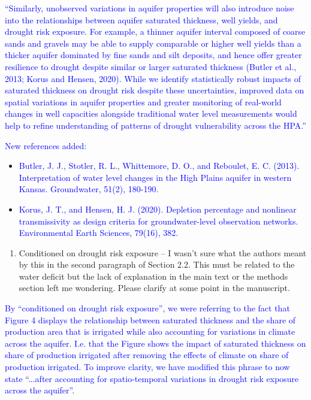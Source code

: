 \documentclass[
]{article}
\providecommand{\tightlist}{%
  \setlength{\itemsep}{0pt}\setlength{\parskip}{0pt}}
\begin{document}
\textcolor{blue}{``Similarly, unobserved variations in aquifer properties will also introduce noise into the relationships between aquifer saturated thickness, well yields, and drought risk exposure. For example, a thinner aquifer interval composed of coarse sands and gravels may be able to supply comparable or higher well yields than a thicker aquifer dominated by fine sands and silt deposits, and hence offer greater resilience to drought despite similar or larger saturated thickness (Butler et al., 2013; Korus and Hensen, 2020). While we identify statistically robust impacts of saturated thickness on drought risk despite these uncertainties, improved data on spatial variations in aquifer properties and greater monitoring of real-world changes in well capacities alongside traditional water level measurements would help to refine understanding of patterns of drought vulnerability across the HPA.''}

\textcolor{blue}{New references added:}

\begin{itemize}
\item
  \textcolor{blue}{Butler, J. J., Stotler, R. L., Whittemore, D. O., and Reboulet, E. C. (2013). Interpretation of water level changes in the High Plains aquifer in western Kansas. Groundwater, 51(2), 180-190.}
\item
  \textcolor{blue}{Korus, J. T., and Hensen, H. J. (2020). Depletion percentage and nonlinear transmissivity as design criteria for groundwater-level observation networks. Environmental Earth Sciences, 79(16), 382.}
\end{itemize}

\begin{enumerate}
\def\labelenumi{\arabic{enumi}.}
\setcounter{enumi}{2}
\tightlist
\item
  Conditioned on drought risk exposure -- I wasn't sure what the authors
  meant by this in the second paragraph of Section 2.2. This must be
  related to the water deficit but the lack of explanation in the main
  text or the methods section left me wondering. Please clarify at some
  point in the manuscript.
\end{enumerate}

\textcolor{blue}{By ``conditioned on drought risk exposure'', we were referring to the fact that Figure 4 displays the relationship between saturated thickness and the share of production area that is irrigated while also accounting for variations in climate across the aquifer. I.e. that the Figure shows the impact of saturated thickness on share of production irrigated after removing the effects of climate on share of production irrigated. To improve clarity, we have modified this phrase to now state ``...after accounting for spatio-temporal variations in drought risk exposure across the aquifer''.}
\end{document}
